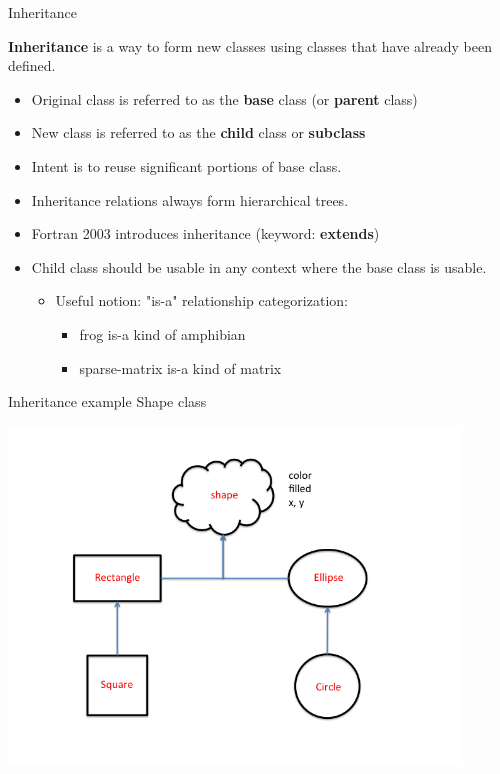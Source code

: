 \documentclass[11pt]{beamer}
\begin{document}
\begin{frame}{Inheritance}

\textbf{Inheritance} is a way to form new classes using classes that have already been defined.
\begin{itemize}

  \item Original class is referred to as the \textbf{base} class (or \textbf{parent} class)
  \item New class is referred to as the \textbf{child} class or \textbf{subclass}
  \item Intent is to reuse significant portions of base class.
  \item Inheritance relations always form hierarchical trees.
  \item Fortran 2003 introduces inheritance (keyword: \textbf{extends})
  \item Child class should be usable in any context where the base class is usable.
  \begin{itemize}
  \item Useful notion: "is-a" relationship categorization:
    \begin{itemize}
    \item frog is-a kind of amphibian
    \item sparse-matrix is-a kind of matrix
    \end{itemize}
  \end{itemize}
  
 \end{itemize}

\end{frame}


\begin{frame}{Inheritance example} 
Shape class
\begin{center} 
  \includegraphics[width=0.9\textwidth]{../../shared/shapeClass.png} 
\end{center} 

\end{frame} 
\end{document}
